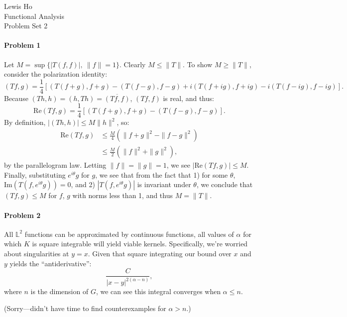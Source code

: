 \documentclass[12pt]{article}
\begin{document}
\begin{center}
  Lewis Ho\\
  Functional Analysis\\
  Problem Set 2
\end{center}

\paragraph{Problem 1}
Let $M = \sup\{|T(f,f)|,\ \|f\| = 1\}$. Clearly $M \leq \|T\|$. To show $M \geq
\|T\|$, consider the polarization identity:
\begin{displaymath}
  (Tf, g) = \frac{1}{4}[(T(f+g),f+g)-(T(f-g),f-g)+i(T(f+ig),f+ig)-i(T(f-ig),
  f-ig)].
\end{displaymath}
Because $(Th,h) = (h,Th) = \overline{(Tf,f)}$, $(Tf,f)$ is real, and thus:
\begin{displaymath}
  \text{Re}(Tf,g) = \frac{1}{4}[(T(f+g),f+g)- (T(f-g),f-g)].
\end{displaymath}
By definition, $|(Th,h)|\leq M\|h\|^2$, so:
\begin{align*}
  \text{Re}(Tf,g) &\leq \frac{M}{4}(\|f+g\|^2 - \|f-g\|^2)\\
  & \leq \frac{M}{2}(\|f\|^2 + \|g\|^2),
\end{align*}
by the parallelogram law. Letting $\|f\| = \|g\| = 1$, we see $|\text{Re}(Tf,g)
| \leq M$. Finally, substituting $e^{i\theta}g$ for $g$, we see that from the fact
that 1) for some $\theta$, $\text{Im}(T(f, e^{i\theta}g)) = 0$, and 2) $|T(f, e^
{i\theta}g)|$ is invariant under $\theta$, we conclude that $(Tf, g) \leq M$ for
$f$, $g$ with norms less than 1, and thus $M = \|T\|$.

\paragraph{Problem 2}
All $\mathbb{L}^2$ functions can be approximated by continuous functions, all
values of $\alpha$ for which $K$ is square integrable will yield viable kernels.
Specifically, we're worried about singularities at $y=x$. Given that square
integrating our bound over $x$ and $y$ yields the ``antiderivative'':
\begin{displaymath}
  \frac{C}{|x-y|^{2(\alpha - n)}},
\end{displaymath}
where $n$ is the dimension of $G$, we can see this integral converges when
$\alpha \leq n$.

(Sorry---didn't have time to find counterexamples for $\alpha > n$.)
\end{document}

